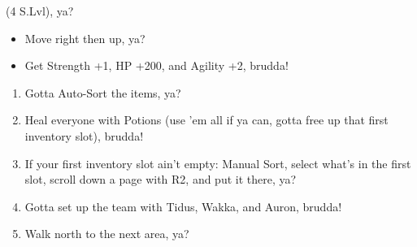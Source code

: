 \begin{spheregrid}
\begin{itemize}
\tidusf (4 S.Lvl), ya?
\begin{itemize}
\item Move right then up, ya?
\item Get Strength +1, HP +200, and Agility +2, brudda!
\end{itemize}
\end{itemize}
\end{spheregrid}
\begin{enumerate}[resume]
\item Gotta Auto-Sort the items, ya?
\item Heal everyone with Potions (use 'em all if ya can, gotta free up that first inventory slot), brudda!
\item If your first inventory slot ain't empty: Manual Sort, select what's in the first slot, scroll down a page with R2, and put it there, ya?
\item Gotta set up the team with Tidus, Wakka, and Auron, brudda!
\item Walk north to the next area, ya?
\end{enumerate}